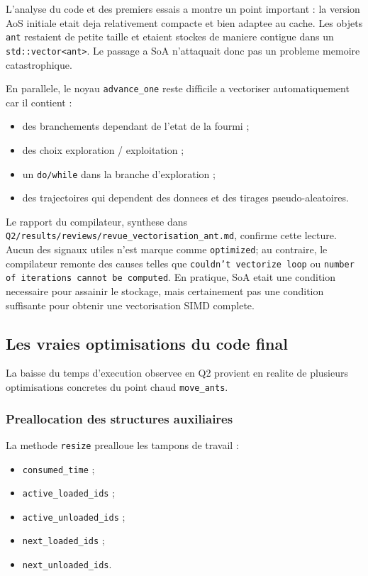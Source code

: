 \documentclass[11pt,a4paper]{article}
\begin{document}
L'analyse du code et des premiers essais a montre un point important : la version AoS initiale etait deja relativement compacte et bien adaptee au cache. Les objets \texttt{ant} restaient de petite taille et etaient stockes de maniere contigue dans un \texttt{std::vector<ant>}. Le passage a SoA n'attaquait donc pas un probleme memoire catastrophique.

En parallele, le noyau \texttt{advance\_one} reste difficile a vectoriser automatiquement car il contient :

\begin{itemize}[leftmargin=1.2em]
  \item des branchements dependant de l'etat de la fourmi ;
  \item des choix exploration / exploitation ;
  \item un \texttt{do/while} dans la branche d'exploration ;
  \item des trajectoires qui dependent des donnees et des tirages pseudo-aleatoires.
\end{itemize}

Le rapport du compilateur, synthese dans \texttt{Q2/results/reviews/revue\_vectorisation\_ant.md}, confirme cette lecture. Aucun des signaux utiles n'est marque comme \texttt{optimized}; au contraire, le compilateur remonte des causes telles que \texttt{couldn't vectorize loop} ou \texttt{number of iterations cannot be computed}. En pratique, SoA etait une condition necessaire pour assainir le stockage, mais certainement pas une condition suffisante pour obtenir une vectorisation SIMD complete.

\subsection{Les vraies optimisations du code final}

La baisse du temps d'execution observee en Q2 provient en realite de plusieurs optimisations concretes du point chaud \texttt{move\_ants}.

\subsubsection{Preallocation des structures auxiliaires}

La methode \texttt{resize} prealloue les tampons de travail :

\begin{itemize}[leftmargin=1.2em]
  \item \texttt{consumed\_time} ;
  \item \texttt{active\_loaded\_ids} ;
  \item \texttt{active\_unloaded\_ids} ;
  \item \texttt{next\_loaded\_ids} ;
  \item \texttt{next\_unloaded\_ids}.
\end{itemize}
\end{document}
